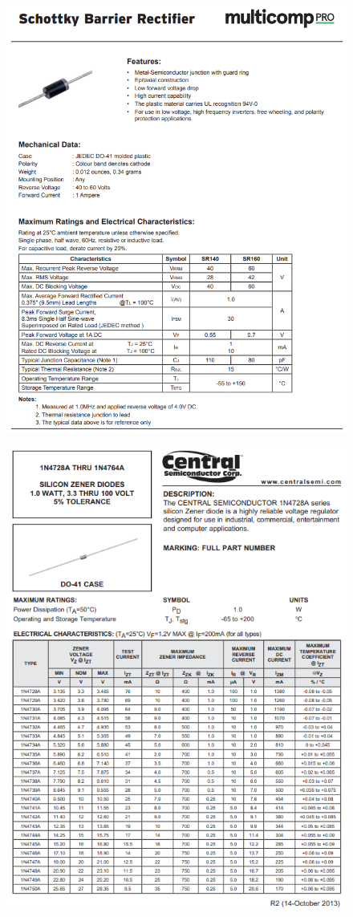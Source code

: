 \begin{figure}[h]
    \centering
    \includegraphics[width=0.9\linewidth]{Appendices/SR160.png}
    \label{SR160}
\end{figure}
\FloatBarrier

\begin{figure}[h]
    \centering
    \includegraphics[width=0.9\linewidth]{Appendices/1N4728A.png}
    \label{1N4728A}
\end{figure}
\FloatBarrier

